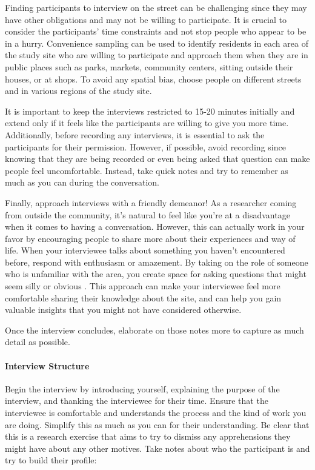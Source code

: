 \documentclass[
]{latex/krantz}
\begin{document}
Finding participants to interview on the street can be challenging since they may have other obligations and may not be willing to participate. It is crucial to consider the participants' time constraints and not stop people who appear to be in a hurry. Convenience sampling can be used to identify residents in each area of the study site who are willing to participate and approach them when they are in public places such as parks, markets, community centers, sitting outside their houses, or at shops. To avoid any spatial bias, choose people on different streets and in various regions of the study site.

It is important to keep the interviews restricted to 15-20 minutes initially and extend only if it feels like the participants are willing to give you more time. Additionally, before recording any interviews, it is essential to ask the participants for their permission. However, if possible, avoid recording since knowing that they are being recorded or even being asked that question can make people feel uncomfortable. Instead, take quick notes and try to remember as much as you can during the conversation.

Finally, approach interviews with a friendly demeanor! As a researcher coming from outside the community, it's natural to feel like you're at a disadvantage when it comes to having a conversation. However, this can actually work in your favor by encouraging people to share more about their experiences and way of life. When your interviewee talks about something you haven't encountered before, respond with enthusiasm or amazement. By taking on the role of someone who is unfamiliar with the area, you create space for asking questions that might seem silly or obvious \autocite{chiswellLongYouRe2016}. This approach can make your interviewee feel more comfortable sharing their knowledge about the site, and can help you gain valuable insights that you might not have considered otherwise.

Once the interview concludes, elaborate on those notes more to capture as much detail as possible.

\hypertarget{interview-structure}{%
\paragraph{Interview Structure}\label{interview-structure}}

Begin the interview by introducing yourself, explaining the purpose of the interview, and thanking the interviewee for their time. Ensure that the interviewee is comfortable and understands the process and the kind of work you are doing. Simplify this as much as you can for their understanding. Be clear that this is a research exercise that aims to try to dismiss any apprehensions they might have about any other motives. Take notes about who the participant is and try to build their profile:
\end{document}
